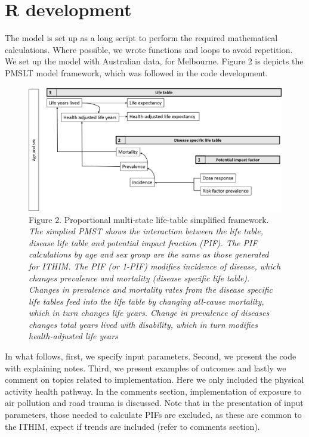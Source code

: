 \documentclass[]{article}
\begin{document}
\section{R development}\label{r-development}

The model is set up as a long script to perform the required
mathematical calculations. Where possible, we wrote functions and loops
to avoid repetition. We set up the model with Australian data, for
Melbourne. Figure 2 is depicts the PMSLT model framework, which was
followed in the code development.

\begin{figure}
\centering
\includegraphics{structure/Figure2.png}
\caption{Figure 2. Proportional multi-state life-table simplified
framework. \emph{The simplied PMST shows the interaction between the
life table, disease life table and potential impact fraction (PIF). The
PIF calculations by age and sex group are the same as those generated
for ITHIM. The PIF (or 1-PIF) modifies incidence of disease, which
changes prevalence and mortality (disease specific life table). Changes
in prevalence and mortality rates from the disease specific life tables
feed into the life table by changing all-cause mortality, which in turn
changes life years. Change in prevalence of diseases changes total years
lived with disability, which in turn modifies health-adjusted life
years}}
\end{figure}

In what follows, first, we specify input parameters. Second, we present
the code with explaining notes. Third, we present examples of outcomes
and lastly we comment on topics related to implementation. Here we only
included the physical activity health pathway. In the comments section,
implementation of exposure to air pollution and road trauma is
discussed. Note that in the presentation of input parameters, those
needed to calculate PIFs are excluded, as these are common to the ITHIM,
expect if trends are included (refer to comments section).
\end{document}
